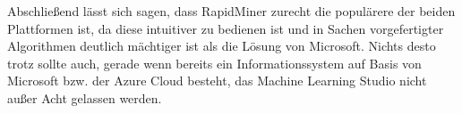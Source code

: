 Abschließend lässt sich sagen, dass RapidMiner zurecht die populärere der
beiden Plattformen ist, da diese intuitiver zu bedienen ist und in Sachen
vorgefertigter Algorithmen deutlich mächtiger ist als die Lösung von Microsoft.
Nichts desto trotz sollte auch, gerade wenn bereits ein Informationssystem auf
Basis von Microsoft bzw. der Azure Cloud besteht, das Machine Learning Studio
nicht außer Acht gelassen werden.

